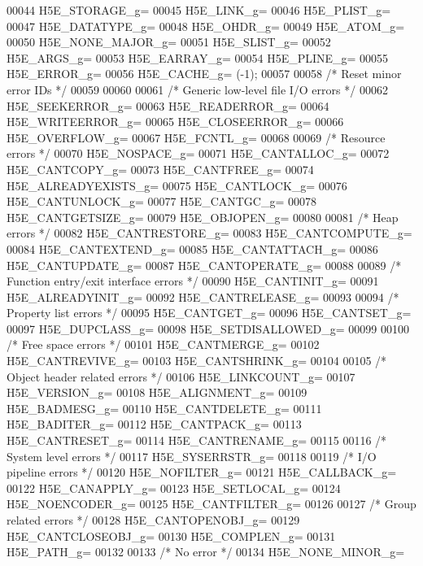 \begin{DoxyCode}
00044 H5E\_STORAGE\_g=    
00045 H5E\_LINK\_g=    
00046 H5E\_PLIST\_g=    
00047 H5E\_DATATYPE\_g=    
00048 H5E\_OHDR\_g=    
00049 H5E\_ATOM\_g=    
00050 H5E\_NONE\_MAJOR\_g=    
00051 H5E\_SLIST\_g=    
00052 H5E\_ARGS\_g=    
00053 H5E\_EARRAY\_g=    
00054 H5E\_PLINE\_g=    
00055 H5E\_ERROR\_g=    
00056 H5E\_CACHE\_g= (-1);
00057 
00058 \textcolor{comment}{/* Reset minor error IDs */}
00059 
00060 
00061 \textcolor{comment}{/* Generic low-level file I/O errors */}    
00062 H5E\_SEEKERROR\_g=    
00063 H5E\_READERROR\_g=    
00064 H5E\_WRITEERROR\_g=    
00065 H5E\_CLOSEERROR\_g=    
00066 H5E\_OVERFLOW\_g=    
00067 H5E\_FCNTL\_g=
00068 
00069 \textcolor{comment}{/* Resource errors */}    
00070 H5E\_NOSPACE\_g=    
00071 H5E\_CANTALLOC\_g=    
00072 H5E\_CANTCOPY\_g=    
00073 H5E\_CANTFREE\_g=    
00074 H5E\_ALREADYEXISTS\_g=    
00075 H5E\_CANTLOCK\_g=    
00076 H5E\_CANTUNLOCK\_g=    
00077 H5E\_CANTGC\_g=    
00078 H5E\_CANTGETSIZE\_g=    
00079 H5E\_OBJOPEN\_g=
00080 
00081 \textcolor{comment}{/* Heap errors */}    
00082 H5E\_CANTRESTORE\_g=    
00083 H5E\_CANTCOMPUTE\_g=    
00084 H5E\_CANTEXTEND\_g=    
00085 H5E\_CANTATTACH\_g=    
00086 H5E\_CANTUPDATE\_g=    
00087 H5E\_CANTOPERATE\_g=
00088 
00089 \textcolor{comment}{/* Function entry/exit interface errors */}    
00090 H5E\_CANTINIT\_g=    
00091 H5E\_ALREADYINIT\_g=    
00092 H5E\_CANTRELEASE\_g=
00093 
00094 \textcolor{comment}{/* Property list errors */}    
00095 H5E\_CANTGET\_g=    
00096 H5E\_CANTSET\_g=    
00097 H5E\_DUPCLASS\_g=    
00098 H5E\_SETDISALLOWED\_g=
00099 
00100 \textcolor{comment}{/* Free space errors */}    
00101 H5E\_CANTMERGE\_g=    
00102 H5E\_CANTREVIVE\_g=    
00103 H5E\_CANTSHRINK\_g=
00104 
00105 \textcolor{comment}{/* Object header related errors */}    
00106 H5E\_LINKCOUNT\_g=    
00107 H5E\_VERSION\_g=    
00108 H5E\_ALIGNMENT\_g=    
00109 H5E\_BADMESG\_g=    
00110 H5E\_CANTDELETE\_g=    
00111 H5E\_BADITER\_g=    
00112 H5E\_CANTPACK\_g=    
00113 H5E\_CANTRESET\_g=    
00114 H5E\_CANTRENAME\_g=
00115 
00116 \textcolor{comment}{/* System level errors */}    
00117 H5E\_SYSERRSTR\_g=
00118 
00119 \textcolor{comment}{/* I/O pipeline errors */}    
00120 H5E\_NOFILTER\_g=    
00121 H5E\_CALLBACK\_g=    
00122 H5E\_CANAPPLY\_g=    
00123 H5E\_SETLOCAL\_g=    
00124 H5E\_NOENCODER\_g=    
00125 H5E\_CANTFILTER\_g=
00126 
00127 \textcolor{comment}{/* Group related errors */}    
00128 H5E\_CANTOPENOBJ\_g=    
00129 H5E\_CANTCLOSEOBJ\_g=    
00130 H5E\_COMPLEN\_g=    
00131 H5E\_PATH\_g=
00132 
00133 \textcolor{comment}{/* No error */}    
00134 H5E\_NONE\_MINOR\_g=

\end{DoxyCode}

